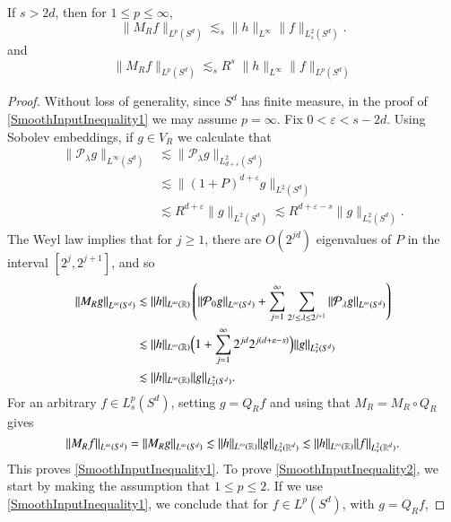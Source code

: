 \begin{lemma} \label{SmoothInputBounds}
    If $s > 2d$, then for $1 \leq p \leq \infty$,
    \begin{equation} \label{SmoothInputInequality1}
        \| M_R f \|_{L^p(S^d)} \lesssim_s \| h \|_{L^\infty} \| f \|_{L^2_s(S^d)}.
    \end{equation}
    and
    \begin{equation} \label{SmoothInputInequality2}
        \| M_R f \|_{L^p(S^d)} \lesssim_s R^s\; \| h \|_{L^\infty} \| f \|_{L^p(S^d)}
    \end{equation}
\end{lemma}
\begin{proof}
    Without loss of generality, since $S^d$ has finite measure, in the proof of \eqref{SmoothInputInequality1} we may assume $p = \infty$. Fix $0 < \varepsilon < s - 2d$. Using Sobolev embeddings, if $g \in V_R$ we calculate that
    \begin{align*}
        \| \mathcal{P}_\lambda g \|_{L^\infty(S^d)} &\lesssim \| \mathcal{P}_\lambda g \|_{L^2_{d+\varepsilon}(S^d)}\\
        &\lesssim \| (1 + P)^{d+\varepsilon} g \|_{L^2(S^d)}\\
        &\lesssim R^{d+\varepsilon} \| g \|_{L^2(S^d)} \lesssim R^{d+\varepsilon-s} \| g \|_{L^2_s(S^d)}.
    \end{align*}
    The Weyl law implies that for $j \geq 1$, there are $O(2^{jd})$ eigenvalues of $P$ in the interval $[2^j,2^{j+1}]$, and so
    \begin{align*}
        \left\| M_R g \right\|_{L^\infty(S^d)} &\lesssim \| h \|_{L^\infty(\operatorname{\mathbb{R}})} \left( \| \mathcal{P}_0 g \|_{L^\infty(S^d)} + \sum_{j = 1}^\infty \sum_{2^j \leq \lambda \leq 2^{j+1}} \| \mathcal{P}_\lambda g \|_{L^\infty(S^d)} \right)\\
        &\lesssim \| h \|_{L^\infty(\operatorname{\mathbb{R}})} \Big( 1 + \sum_{j = 1}^\infty 2^{jd} 2^{j(d+\varepsilon - s)} \Big) \| g \|_{L^2_s(S^d)}\\
        &\lesssim \| h \|_{L^\infty(\operatorname{\mathbb{R}})} \| g \|_{L^2_s(S^d)}.
    \end{align*}
    For an arbitrary $f \in L^p_s(S^d)$, setting $g = Q_R f$ and using that $M_R = M_R \circ Q_R$ gives
    \[ \| M_R f \|_{L^\infty(S^d)} = \| M_R g \|_{L^\infty(S^d)} \lesssim \| h \|_{L^\infty(\operatorname{\mathbb{R}})} \| g \|_{L^2_s(\operatorname{\mathbb{R}}^d)} \lesssim \| h \|_{L^\infty(\operatorname{\mathbb{R}})} \| f \|_{L^2_s(\operatorname{\mathbb{R}}^d)}. \]
    This proves \eqref{SmoothInputInequality1}. To prove \eqref{SmoothInputInequality2}, we start by making the assumption that $1 \leq p \leq 2$. If we use \eqref{SmoothInputInequality1}, we conclude that for $f \in L^p(S^d)$, with $g = Q_R f$,

\end{proof}
